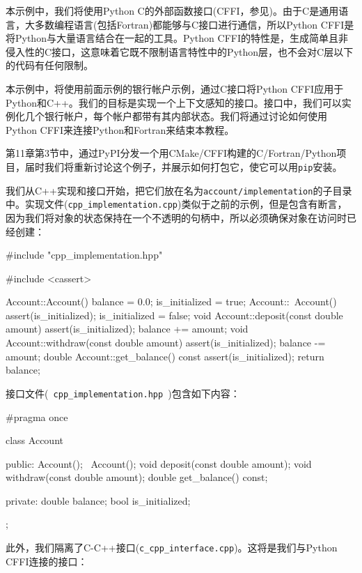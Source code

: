 本示例中，我们将使用Python C的外部函数接口(CFFI，参见)。由于C是通用语言，大多数编程语言(包括Fortran)都能够与C接口进行通信，所以Python CFFI是将Python与大量语言结合在一起的工具。Python CFFI的特性是，生成简单且非侵入性的C接口，这意味着它既不限制语言特性中的Python层，也不会对C层以下的代码有任何限制。

本示例中，将使用前面示例的银行帐户示例，通过C接口将Python CFFI应用于Python和C++。我们的目标是实现一个上下文感知的接口。接口中，我们可以实例化几个银行帐户，每个帐户都带有其内部状态。我们将通过讨论如何使用Python CFFI来连接Python和Fortran来结束本教程。

第11章第3节中，通过PyPI分发一个用CMake/CFFI构建的C/Fortran/Python项目，届时我们将重新讨论这个例子，并展示如何打包它，使它可以用\texttt{pip}安装。


我们从C++实现和接口开始，把它们放在名为\texttt{account/implementation}的子目录中。实现文件(\texttt{cpp\_implementation.cpp})类似于之前的示例，但是包含有断言，因为我们将对象的状态保持在一个不透明的句柄中，所以必须确保对象在访问时已经创建：

\begin{codebox}[cpp]
#include "cpp_implementation.hpp"

#include <cassert>

Account::Account()
{
  balance = 0.0;
  is_initialized = true;
}
Account::~Account()
{
  assert(is_initialized);
  is_initialized = false;
}
void Account::deposit(const double amount)
{
  assert(is_initialized);
  balance += amount;
}
void Account::withdraw(const double amount)
{
  assert(is_initialized);
  balance -= amount;
}
double Account::get_balance() const
{
  assert(is_initialized);
  return balance;
}
\end{codebox}

接口文件(\texttt{ cpp\_implementation.hpp })包含如下内容：

\begin{codebox}[cpp]
#pragma once

class Account
{
public:
  Account();
  ~Account();
  void deposit(const double amount);
  void withdraw(const double amount);
  double get_balance() const;

private:
  double balance;
  bool is_initialized;
};
\end{codebox}

此外，我们隔离了C-C++接口(\texttt{c\_cpp\_interface.cpp})。这将是我们与Python CFFI连接的接口：

